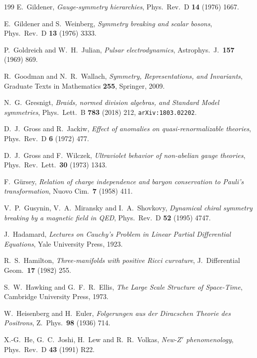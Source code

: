 \begin{thebibliography}{199}
 E.~Gildener, \emph{Gauge-symmetry hierarchies}, Phys.~Rev.~D \textbf{14} (1976) 1667.

 E.~Gildener and S.~Weinberg, \emph{Symmetry breaking and scalar bosons}, Phys.~Rev.~D \textbf{13} (1976) 3333.

 P.~Goldreich and W.~H.~Julian, \emph{Pulsar electrodynamics}, Astrophys.~J.~\textbf{157} (1969) 869.

 R.~Goodman and N.~R.~Wallach, \emph{Symmetry, Representations, and Invariants}, Graduate Texts in Mathematics \textbf{255}, Springer, 2009.

 N.~G.~Gresnigt, \emph{Braids, normed division algebras, and Standard Model symmetries}, Phys.~Lett.~B \textbf{783} (2018) 212, \texttt{arXiv:1803.02202}.

 D.~J.~Gross and R.~Jackiw, \emph{Effect of anomalies on quasi-renormalizable theories}, Phys.~Rev.~D \textbf{6} (1972) 477.

 D.~J.~Gross and F.~Wilczek, \emph{Ultraviolet behavior of non-abelian gauge theories}, Phys.~Rev.~Lett.~\textbf{30} (1973) 1343.

 F.~G\"ursey, \emph{Relation of charge independence and baryon conservation to Pauli's transformation}, Nuovo Cim.~\textbf{7} (1958) 411.

 V.~P.~Gusynin, V.~A.~Miransky and I.~A.~Shovkovy, \emph{Dynamical chiral symmetry breaking by a magnetic field in QED},
Phys.~Rev.~D \textbf{52} (1995) 4747.

 J.~Hadamard, \emph{Lectures on Cauchy's Problem in Linear Partial Differential Equations}, Yale University Press, 1923.

 R.~S.~Hamilton, \emph{Three-manifolds with positive Ricci curvature}, J.~Differential Geom.~\textbf{17} (1982) 255.

 S.~W.~Hawking and G.~F.~R.~Ellis, \emph{The Large Scale Structure of Space-Time}, Cambridge University Press, 1973.

 W.~Heisenberg and H.~Euler, \emph{Folgerungen aus der Diracschen Theorie des Positrons}, Z.~Phys.~\textbf{98} (1936) 714.

 X.-G.~He, G.~C.~Joshi, H.~Lew and R.~R.~Volkas, \emph{New-$Z'$ phenomenology}, Phys.~Rev.~D \textbf{43} (1991) R22.


\end{thebibliography}
